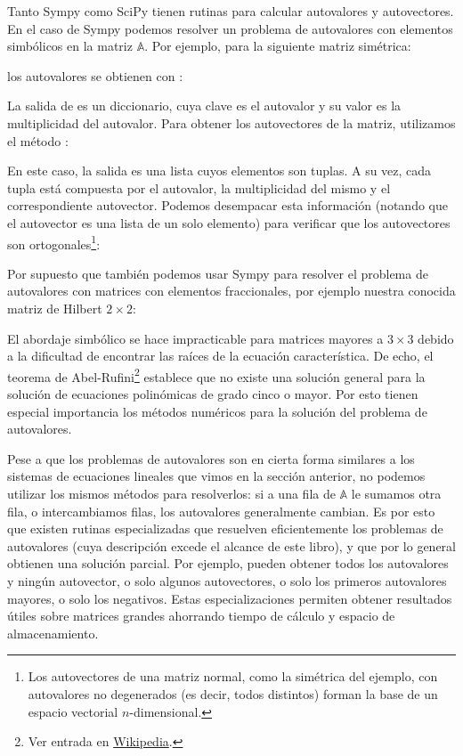 Tanto Sympy como SciPy tienen rutinas para calcular autovalores y autovectores. En el caso de Sympy podemos resolver un problema de autovalores con elementos simbólicos en la matriz $\mathbb{A}$. Por ejemplo, para la siguiente matriz simétrica:

los autovalores se obtienen con :


La salida de  es un diccionario, cuya clave es el autovalor y su valor es la multiplicidad del autovalor. Para obtener los autovectores de la matriz, utilizamos el método :


En este caso, la salida es una lista cuyos elementos son tuplas. A su vez, cada tupla está compuesta por el autovalor, la multiplicidad del mismo y el correspondiente autovector. Podemos desempacar esta información (notando que el autovector es una lista de un solo elemento) para verificar que los autovectores son ortogonales\footnote{Los autovectores de una matriz normal, como la simétrica del ejemplo, con autovalores no degenerados (es decir, todos distintos) forman la base de un espacio vectorial $n$-dimensional.}:

Por supuesto que también podemos usar Sympy para resolver el problema de autovalores con matrices con elementos fraccionales, por ejemplo nuestra conocida matriz de Hilbert $2 \times 2$:

El abordaje simbólico se hace impracticable para matrices mayores a $3 \times 3$ debido a la dificultad de encontrar las raíces de la ecuación característica. De echo, el teorema de Abel-Rufini\footnote{Ver entrada en \href{https://es.wikipedia.org/wiki/Teorema_de_Abel-Ruffini}{Wikipedia}.} establece que no existe una solución general para la solución de ecuaciones polinómicas de grado cinco o mayor. Por esto tienen especial importancia los métodos numéricos para la solución del problema de autovalores.

Pese a que los problemas de autovalores son en cierta forma similares a los sistemas de ecuaciones lineales que vimos en la sección anterior, no podemos utilizar los mismos métodos para resolverlos: si a una fila de $\mathbb{A}$ le sumamos otra fila, o intercambiamos filas, los autovalores generalmente cambian. Es por esto que existen rutinas especializadas que resuelven eficientemente los problemas de autovalores (cuya descripción excede el alcance de este libro), y que por lo general obtienen una solución parcial. Por ejemplo, pueden obtener todos los autovalores y ningún autovector, o solo algunos autovectores, o solo los primeros autovalores mayores, o solo los negativos. Estas especializaciones permiten obtener resultados útiles sobre matrices grandes ahorrando tiempo de cálculo y espacio de almacenamiento.

